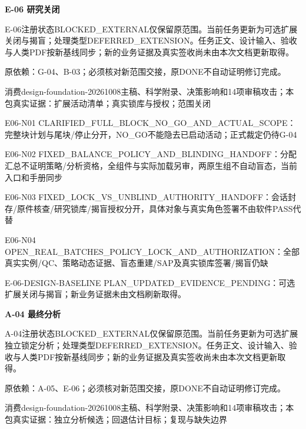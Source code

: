 \documentclass[11pt,a4paper]{article}
\newcommand{\reviewsection}[1]{\par\Needspace{5\baselineskip}\vspace{10pt}\begin{center}{\titlelatin\titlecjk\bfseries\fontsize{14}{20}\selectfont #1}\end{center}}
\begin{document}
\reviewsection{E-\allowbreak{}06 研究关闭}
E-\allowbreak{}06注册状态BLOCKED\_\allowbreak{}EXTERNAL仅保留原范围。当前任务更新为可选扩展关闭与揭盲；处理类型DEFERRED\_\allowbreak{}EXTENSION。任务正文、设计输入、验收与人类PDF按新基线同步；新的业务证据及真实签收尚未由本次文档更新取得。


原依赖：G-\allowbreak{}04、B-\allowbreak{}03；必须核对新范围交接，原DONE不自动证明修订完成。


消费design-\allowbreak{}foundation-\allowbreak{}20261008主稿、科学附录、决策影响和14项审稿攻击；本包真实证据：扩展活动清单；真实锁库与授权；范围关闭


E06-\allowbreak{}N01 CLARIFIED\_\allowbreak{}FULL\_\allowbreak{}BLOCK\_\allowbreak{}NO\_\allowbreak{}GO\_\allowbreak{}AND\_\allowbreak{}ACTUAL\_\allowbreak{}SCOPE：完整块计划与尾块/\allowbreak{}停止分开，NO\_\allowbreak{}GO不能隐去已启动活动；正式裁定仍待G-\allowbreak{}04


E06-\allowbreak{}N02 FIXED\_\allowbreak{}BALANCE\_\allowbreak{}POLICY\_\allowbreak{}AND\_\allowbreak{}BLINDING\_\allowbreak{}HANDOFF：分配汇总不证明策略/\allowbreak{}分析资格，全组件与实际加载另审，两原生组不自动盲态，当前入口和手册同步


E06-\allowbreak{}N03 FIXED\_\allowbreak{}LOCK\_\allowbreak{}VS\_\allowbreak{}UNBLIND\_\allowbreak{}AUTHORITY\_\allowbreak{}HANDOFF：会话封存/\allowbreak{}原件核查/\allowbreak{}研究锁库/\allowbreak{}揭盲授权分开，具体对象与真实角色签署不由软件PASS代替


E06-\allowbreak{}N04 OPEN\_\allowbreak{}REAL\_\allowbreak{}BATCHES\_\allowbreak{}POLICY\_\allowbreak{}LOCK\_\allowbreak{}AND\_\allowbreak{}AUTHORIZATION：全部真实实例/\allowbreak{}QC、策略动态证据、盲态重建/\allowbreak{}SAP及真实锁库签署/\allowbreak{}揭盲仍缺


E-\allowbreak{}06-\allowbreak{}DESIGN-\allowbreak{}BASELINE PLAN\_\allowbreak{}UPDATED\_\allowbreak{}EVIDENCE\_\allowbreak{}PENDING：可选扩展关闭与揭盲；新业务证据未由文档刷新取得。


\reviewsection{A-\allowbreak{}04 最终分析}
A-\allowbreak{}04注册状态BLOCKED\_\allowbreak{}EXTERNAL仅保留原范围。当前任务更新为可选扩展独立锁定分析；处理类型DEFERRED\_\allowbreak{}EXTENSION。任务正文、设计输入、验收与人类PDF按新基线同步；新的业务证据及真实签收尚未由本次文档更新取得。


原依赖：A-\allowbreak{}05、E-\allowbreak{}06；必须核对新范围交接，原DONE不自动证明修订完成。


消费design-\allowbreak{}foundation-\allowbreak{}20261008主稿、科学附录、决策影响和14项审稿攻击；本包真实证据：独立分析候选；回退估计目标；复现与缺失边界
\end{document}
